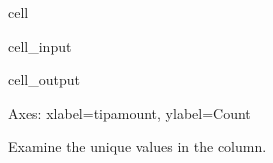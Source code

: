 \documentclass[letterpaper,10pt,english]{sphinxmanual}
\begin{document}
\begin{sphinxuseclass}{cell}
\begin{sphinxuseclass}{cell_input}
\begin{sphinxVerbatim}[commandchars=\\\{\}]
\PYG{p}{[}\PYG{p}{]} 
\end{sphinxVerbatim}

\end{sphinxuseclass}
\begin{sphinxuseclass}{cell_output}
\begin{sphinxVerbatim}[commandchars=\\\{\}]
\PYGZlt{}Axes: xlabel=\PYGZsq{}tip\PYGZus{}amount\PYGZsq{}, ylabel=\PYGZsq{}Count\PYGZsq{}\PYGZgt{}
\end{sphinxVerbatim}

\noindent{}

\end{sphinxuseclass}
\end{sphinxuseclass}
\sphinxAtStartPar
{}

\sphinxAtStartPar
Examine the unique values in the  column.
\end{document}
